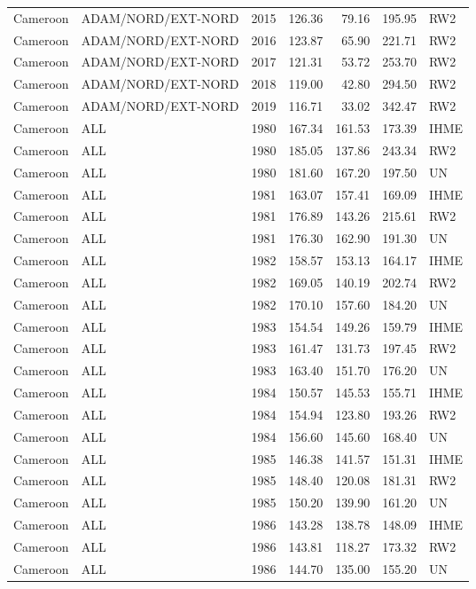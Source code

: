 \begin{longtable}{lllrrrl}
  Cameroon & ADAM/NORD/EXT-NORD & 2015 & 126.36 & 79.16 & 195.95 & RW2 \\ 
  Cameroon & ADAM/NORD/EXT-NORD & 2016 & 123.87 & 65.90 & 221.71 & RW2 \\ 
  Cameroon & ADAM/NORD/EXT-NORD & 2017 & 121.31 & 53.72 & 253.70 & RW2 \\ 
  Cameroon & ADAM/NORD/EXT-NORD & 2018 & 119.00 & 42.80 & 294.50 & RW2 \\ 
  Cameroon & ADAM/NORD/EXT-NORD & 2019 & 116.71 & 33.02 & 342.47 & RW2 \\ 
  Cameroon & ALL & 1980 & 167.34 & 161.53 & 173.39 & IHME \\ 
  Cameroon & ALL & 1980 & 185.05 & 137.86 & 243.34 & RW2 \\ 
  Cameroon & ALL & 1980 & 181.60 & 167.20 & 197.50 & UN \\ 
  Cameroon & ALL & 1981 & 163.07 & 157.41 & 169.09 & IHME \\ 
  Cameroon & ALL & 1981 & 176.89 & 143.26 & 215.61 & RW2 \\ 
  Cameroon & ALL & 1981 & 176.30 & 162.90 & 191.30 & UN \\ 
  Cameroon & ALL & 1982 & 158.57 & 153.13 & 164.17 & IHME \\ 
  Cameroon & ALL & 1982 & 169.05 & 140.19 & 202.74 & RW2 \\ 
  Cameroon & ALL & 1982 & 170.10 & 157.60 & 184.20 & UN \\ 
  Cameroon & ALL & 1983 & 154.54 & 149.26 & 159.79 & IHME \\ 
  Cameroon & ALL & 1983 & 161.47 & 131.73 & 197.45 & RW2 \\ 
  Cameroon & ALL & 1983 & 163.40 & 151.70 & 176.20 & UN \\ 
  Cameroon & ALL & 1984 & 150.57 & 145.53 & 155.71 & IHME \\ 
  Cameroon & ALL & 1984 & 154.94 & 123.80 & 193.26 & RW2 \\ 
  Cameroon & ALL & 1984 & 156.60 & 145.60 & 168.40 & UN \\ 
  Cameroon & ALL & 1985 & 146.38 & 141.57 & 151.31 & IHME \\ 
  Cameroon & ALL & 1985 & 148.40 & 120.08 & 181.31 & RW2 \\ 
  Cameroon & ALL & 1985 & 150.20 & 139.90 & 161.20 & UN \\ 
  Cameroon & ALL & 1986 & 143.28 & 138.78 & 148.09 & IHME \\ 
  Cameroon & ALL & 1986 & 143.81 & 118.27 & 173.32 & RW2 \\ 
  Cameroon & ALL & 1986 & 144.70 & 135.00 & 155.20 & UN \\ 

\end{longtable}
